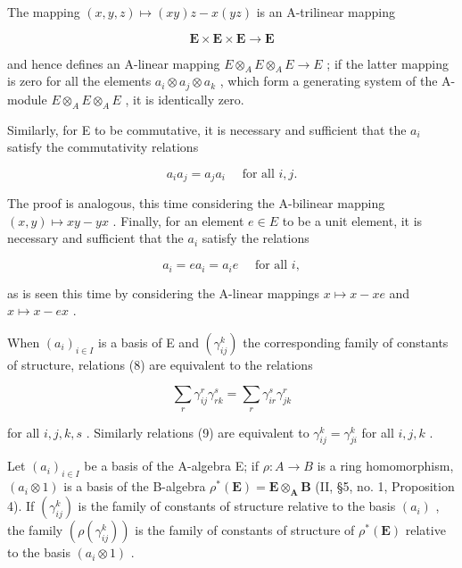 The mapping \((x, y, z) \mapsto (xy)z - x(yz)\) is an A-trilinear mapping

\[
\mathbf {E} \times \mathbf {E} \times \mathbf {E} \rightarrow \mathbf {E}
\]

and hence defines an A-linear mapping \(E \otimes_{A} E \otimes_{A} E \to E\) ; if the latter mapping is zero for all the elements \(a_{i} \otimes a_{j} \otimes a_{k}\) , which form a generating system of the A-module \(E \otimes_{A} E \otimes_{A} E\) , it is identically zero.

Similarly, for E to be commutative, it is necessary and sufficient that the \(a_{i}\) satisfy the commutativity relations

\[
a _ {i} a _ {j} = a _ {j} a _ {i} \quad \text { for   all } i, j.\tag{9}
\]

The proof is analogous, this time considering the A-bilinear mapping \((x,y)\mapsto xy - yx\) . Finally, for an element \(e\in E\) to be a unit element, it is necessary and sufficient that the \(a_{i}\) satisfy the relations

\[
a _ {i} = e a _ {i} = a _ {i} e \quad \text { for   all } i,\tag{10}
\]

as is seen this time by considering the A-linear mappings \(x \mapsto x - xe\) and \(x \mapsto x - ex\) .

When \((a_{i})_{i\in I}\) is a basis of E and \((\gamma_{ij}^{k})\) the corresponding family of constants of structure, relations (8) are equivalent to the relations

\[
\sum_ {r} \gamma_ {i j} ^ {r} \gamma_ {r k} ^ {s} = \sum_ {r} \gamma_ {i r} ^ {s} \gamma_ {j k} ^ {r}
\]

for all \(i, j, k, s\) . Similarly relations (9) are equivalent to \(\gamma_{ij}^{k} = \gamma_{ji}^{k}\) for all \(i, j, k\) .

Let \((a_{i})_{i\in I}\) be a basis of the A-algebra E; if \(\rho :A\to B\) is a ring homomorphism, \((a_{i}\otimes 1)\) is a basis of the B-algebra \(\rho^{*}(\mathbf{E}) = \mathbf{E}\otimes_{\mathbf{A}}\mathbf{B}\) (II, §5, no. 1, Proposition 4). If \((\gamma_{ij}^{k})\) is the family of constants of structure relative to the basis \((a_{i})\) , the family \((\rho (\gamma_{ij}^{k}))\) is the family of constants of structure of \(\rho^{*}(\mathbf{E})\) relative to the basis \((a_{i}\otimes 1)\) .

